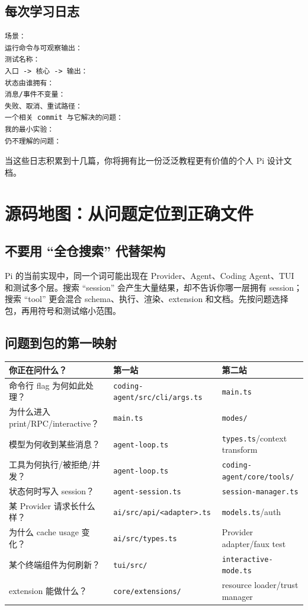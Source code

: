 \documentclass[UTF8,openany,11pt]{ctexbook}
\begin{document}
\section{每次学习日志}
\begin{Verbatim}[fontsize=\small]
场景：
运行命令与可观察输出：
测试名称：
入口 -> 核心 -> 输出：
状态由谁拥有：
消息/事件不变量：
失败、取消、重试路径：
一个相关 commit 与它解决的问题：
我的最小实验：
仍不理解的问题：
\end{Verbatim}
当这些日志积累到十几篇，你将拥有比一份泛泛教程更有价值的个人 Pi 设计文档。

\chapter{源码地图：从问题定位到正确文件}

\section{不要用 ``全仓搜索'' 代替架构}
Pi 的当前实现中，同一个词可能出现在 Provider、Agent、Coding Agent、TUI 和测试多个层。搜索 ``session'' 会产生大量结果，却不告诉你哪一层拥有 session；搜索 ``tool'' 更会混合 schema、执行、渲染、extension 和文档。先按问题选择包，再用符号和测试缩小范围。

\section{问题到包的第一映射}
\begin{longtable}{p{}p{}p{}}
\toprule
你正在问什么？ & 第一站 & 第二站\\
\midrule
命令行 flag 为何如此处理？ & \texttt{coding-agent/src/cli/args.ts} & \texttt{main.ts}\\
为什么进入 print/RPC/interactive？ & \texttt{main.ts} & \texttt{modes/}\\
模型为何收到某些消息？ & \texttt{agent-loop.ts} & \texttt{types.ts}/context transform\\
工具为何执行/被拒绝/并发？ & \texttt{agent-loop.ts} & \texttt{coding-agent/core/tools/}\\
状态何时写入 session？ & \texttt{agent-session.ts} & \texttt{session-manager.ts}\\
某 Provider 请求长什么样？ & \texttt{ai/src/api/<adapter>.ts} & \texttt{models.ts}/auth\\
为什么 cache usage 变化？ & \texttt{ai/src/types.ts} & Provider adapter/faux test\\
某个终端组件为何刷新？ & \texttt{tui/src/} & \texttt{interactive-mode.ts}\\
extension 能做什么？ & \texttt{core/extensions/} & resource loader/trust manager\\
\bottomrule
\end{longtable}
\end{document}
